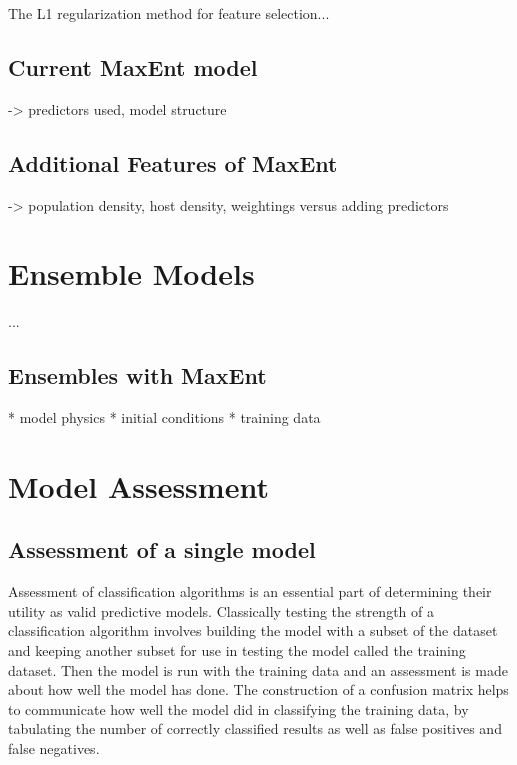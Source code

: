 \noindent The L1 regularization method for feature selection... \newline

\subsection{Current MaxEnt model}

-> predictors used, model structure \newline


\subsection{Additional Features of MaxEnt}

-> population density, \newline host density, \newline weightings versus adding predictors \newline




\section{Ensemble Models}


 ...\newline

\subsection{Ensembles with MaxEnt}
* model physics \newline
* initial conditions\newline
* training data \newline



\section{Model Assessment }

\subsection{Assessment of a single model}

Assessment of classification algorithms is an essential part of determining their utility as valid predictive models. Classically testing the strength of a classification algorithm involves building the model with a subset of the dataset and keeping another subset for use in testing the model called the training dataset. Then the model is run with the training data and an assessment is made about how well the model has done. The construction of a confusion matrix helps to communicate how well the model did in classifying the training data, by tabulating the number of correctly classified results as well as false positives and false negatives. 

